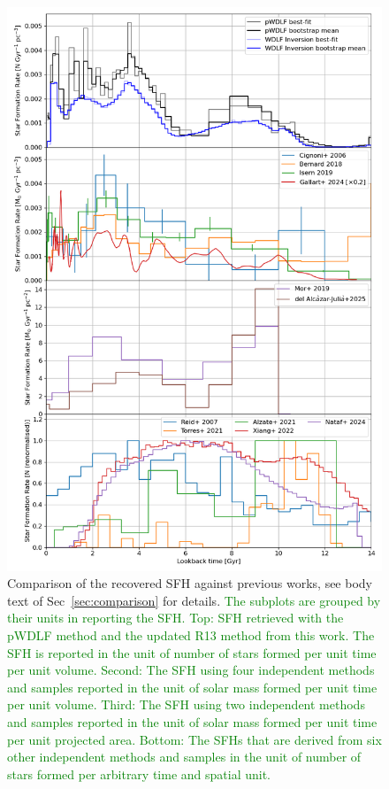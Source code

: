 \documentclass[fleqn,usenatbib]{mnras}
\begin{document}
\begin{figure}
  \includegraphics[width=\columnwidth]{figures/fig_10_compare_sfh.png}
  \caption{Comparison of the recovered SFH against previous works, see body
  text of Sec~\ref{sec:comparison} for details. \textcolor{green}{The subplots are 
  grouped by their units in reporting the SFH. Top: SFH retrieved with the
  pWDLF method and the updated R13 method from this work. The SFH is reported
  in the unit of number of stars formed per unit time per unit volume.
  Second: The SFH using four independent methods and samples reported in the
  unit of solar mass formed per unit time per unit volume. Third: The SFH using
  two independent methods and samples reported in the unit of solar mass formed
  per unit time per unit projected area. Bottom: The SFHs that are derived from
  six other independent methods and samples in the unit of number of stars formed
  per arbitrary time and spatial unit.}}
  \label{fig:comparison}
\end{figure}
\end{document}
